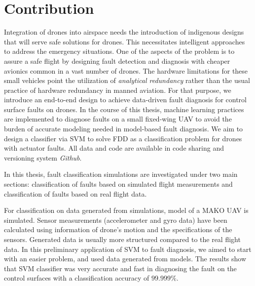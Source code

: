 \section{Contribution}

Integration of drones into airspace needs the introduction of indigenous designs that will serve safe solutions for drones. This necessitates intelligent approaches to address the emergency situations. One of the aspects of the problem is to assure a safe flight by designing fault detection and diagnosis with cheaper avionics common in a vast number of drones.
The hardware limitations for these small vehicles point the utilization of \emph{analytical redundancy} rather than the usual practice of hardware redundancy in manned aviation. 
For that purpose, we introduce an end-to-end design to achieve data-driven fault diagnosis for control surface faults on drones.
In the course of this thesis, machine learning practices are implemented to diagnose faults on a small fixed-wing UAV to avoid the burden of accurate modeling needed in model-based fault diagnosis. 
We aim to design a classifier via SVM to solve FDD as a classification problem for drones with actuator faults.
All data and code are available in code sharing and versioning system \emph{Github}. 

In this thesis, fault classification simulations are investigated under two main sections: classification of faults based on simulated flight measurements and classification of faults based on real flight data. 

For classification on data generated from simulations, model of a MAKO UAV \cite{baskaya2017flight} is simulated.
Sensor measurements (accelerometer and gyro data) have been calculated using information of drone's motion and the specifications of the sensors. 
Generated data is usually more structured compared to the real flight data. 
In this preliminary application of SVM to fault diagnosis, we aimed to start with an easier problem, and used data generated from models.
The results show that SVM classifier was very accurate and fast in diagnosing the fault on the control surfaces with a classification accuracy of $99.999\%$.

